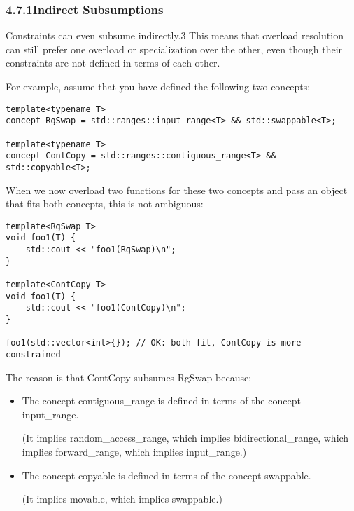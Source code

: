 \subsubsection*{ 4.7.1\hspace{0.2cm}Indirect Subsumptions}

Constraints can even subsume indirectly.3 This means that overload resolution can still prefer one overload
or specialization over the other, even though their constraints are not defined in terms of each other.

For example, assume that you have defined the following two concepts:

\begin{lstlisting}[style=styleCXX]
template<typename T>
concept RgSwap = std::ranges::input_range<T> && std::swappable<T>;

template<typename T>
concept ContCopy = std::ranges::contiguous_range<T> && std::copyable<T>;
\end{lstlisting}

When we now overload two functions for these two concepts and pass an object that fits both concepts, this is not ambiguous:

\begin{lstlisting}[style=styleCXX]
template<RgSwap T>
void foo1(T) {
	std::cout << "foo1(RgSwap)\n";
}

template<ContCopy T>
void foo1(T) {
	std::cout << "foo1(ContCopy)\n";
}

foo1(std::vector<int>{}); // OK: both fit, ContCopy is more constrained
\end{lstlisting}

The reason is that ContCopy subsumes RgSwap because:

\begin{itemize}
\item
The concept contiguous\_range is defined in terms of the concept input\_range.

(It implies random\_access\_range, which implies bidirectional\_range, which implies forward\_range, which implies input\_range.)

\item
The concept copyable is defined in terms of the concept swappable.

(It implies movable, which implies swappable.)
\end{itemize}

